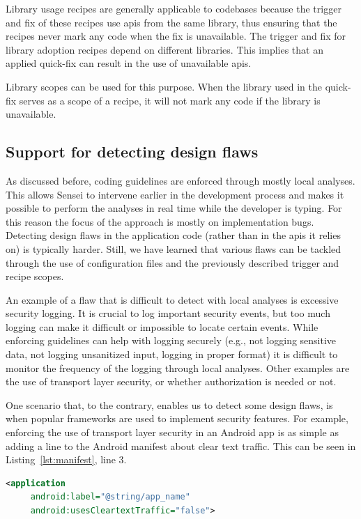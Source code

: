 Library usage recipes are generally applicable to codebases because the trigger and fix of these recipes use \glspl{api} from the same library, thus ensuring that the recipes never mark any code when the fix is unavailable.
The trigger and fix for library adoption recipes depend on different libraries.
This implies that an applied quick-fix can result in the use of unavailable \glspl{api}. 

Library scopes can be used for this purpose.
When the library used in the quick-fix serves as a scope of a recipe, it will not mark any code if the library is unavailable.

\subsection{Support for detecting design flaws}
As discussed before, coding guidelines are enforced through mostly local analyses.
This allows Sensei to intervene earlier in the development process and makes it possible to perform the analyses in real time while the developer is typing.
For this reason the focus of the approach is mostly on implementation bugs.
Detecting design flaws in the application code (rather than in the \glspl{api} it relies on) is typically harder.
Still, we have learned that various flaws can be tackled through the use of configuration files and the previously described trigger and recipe scopes.

An example of a flaw that is difficult to detect with local analyses is excessive security logging.
It is crucial to log important security events, but too much logging can make it difficult or impossible to locate certain events.
While enforcing guidelines can help with logging securely (e.g., not logging sensitive data, not logging unsanitized input, logging in proper format) it is difficult to monitor the frequency of the logging through local analyses.
Other examples are the use of transport layer security, or whether authorization is needed or not.

One scenario that, to the contrary, enables us to detect some design flaws, is when popular frameworks are used to implement security features.
For example, enforcing the use of transport layer security in an Android app is as simple as adding a line to the Android manifest about clear text traffic.
This can be seen in Listing~\ref{lst:manifest}, line 3.

\begin{lstlisting}[language={XML},caption={When the attribute \texttt{usesCleartextTraffic} is added to the Android manifest with value \texttt{false}, the Android \gls{os} will ensure that transport layer security is used for the communication with this application.},float,label={lst:manifest},abovecaptionskip=-0.5pt]
<application
     android:label="@string/app_name"
     android:usesCleartextTraffic="false">
\end{lstlisting}

